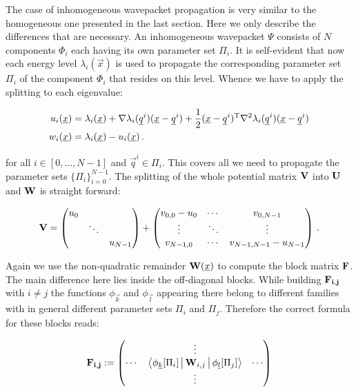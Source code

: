 The case of inhomogeneous wavepacket propagation is very similar to the homogeneous
one presented in the last section. Here we only describe the differences that
are necessary. An inhomogeneous wavepacket $\Psi$ consists of $N$ components
$\Phi_i$ each having its own parameter set $\Pi_i$. It is self-evident that now
each energy level $\lambda_i(\vec{x})$ is used to propagate the corresponding
parameter set $\Pi_i$ of the component $\Phi_i$ that resides on this level.
Whence we have to apply the splitting to each eigenvalue:

\begin{align*}
  u_i(\underline{x}) & = \lambda_i(\underline{x}) + \nabla \lambda_i(\underline{q}^i) (\underline{x}-\underline{q}^i)
                      + \frac{1}{2} (\underline{x}-\underline{q}^i){}^{\textnormal{T}} \nabla^2 \lambda_i(\underline{q}^i) (\underline{x}-\underline{q}^i) \\
  w_i(\underline{x}) & = \lambda_i(\underline{x}) - u_i(\underline{x}) \,.
\end{align*}

for all $i \in [0, \ldots, N-1]$ and $\vec{q}^i \in \Pi_i$. This covers all we
need to propagate the parameter sets $\{ \Pi_i \}_{i=0}^{N-1}$. The splitting of
the whole potential matrix $\mathbf{V}$ into $\mathbf{U}$ and $\mathbf{W}$ is straight forward:

\begin{equation*}
  \mathbf{V} =
  \begin{pmatrix}
    u_0 & {}     & {} \\
    {}  & \ddots & {} \\
    {}  &        & u_{N-1}
  \end{pmatrix}
  +
    \begin{pmatrix}
    v_{0,0} - u_0 & \cdots & v_{0,N-1} \\
    \vdots        & \ddots & \vdots \\
    v_{N-1,0}     & \cdots & v_{N-1,N-1} - u_{N-1}
  \end{pmatrix} \,.
\end{equation*}

Again we use the non-quadratic remainder $\mathbf{W}(\underline{x})$ to compute the block
matrix $\mathbf{F}$. The main difference here lies inside the off-diagonal blocks. While
building $\mathbf{F_{i,j}}$ with $i \neq j$ the functions $\phi_{\vec{k}}$
and $\phi_{\vec{l}}$ appearing there belong to different families with in general
different parameter sets $\Pi_i$ and $\Pi_j$. Therefore the correct formula for
these blocks reads:

\begin{equation*}
  \mathbf{F_{i,j}} :=
    \begin{pmatrix}
    {}     & \vdots                                                                  & {} \\
    \cdots & \Braket{ \phi_{\underline{k}}[\Pi_i] | \mathbf{W}_{i,j} | \phi_{\underline{l}}[\Pi_j] } & \cdots \\
    {}     & \vdots                                                                  & {}
  \end{pmatrix}
\end{equation*}

